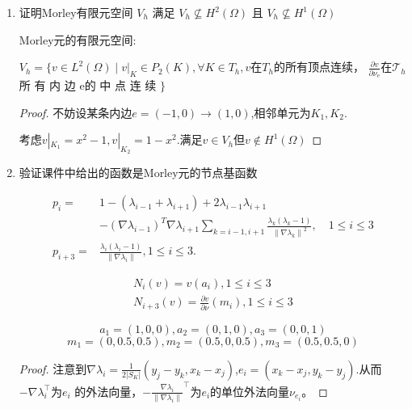 \documentclass[12pt,a4paper]{article}
\begin{document}
\begin{enumerate}
\begin{proof}
			解得
			$$a_1=a_2=a_3=a_4 = 0$$
			
			从而$v \equiv 0$.
		\end{proof}
		\item 证明Morley有限元空间 $V_h$ 满足 $V_h \nsubseteq H^2(\Omega)$ 且 $V_h \nsubseteq H^1(\Omega)$
		
		Morley元的有限元空间:
		
		$V_h=\{v\in L^2(\Omega)\mid v|_K\in P_2(K),\forall K\in T_h,v$在$T_h$的所有顶点连续，
		$\frac{\partial v}{\partial\nu_\mathrm{e}}$在$\mathcal{T} _h$所 有 内 边 e的 中 点 连 续 $\}$
		
		\begin{proof}
			不妨设某条内边$e = (-1,0)\rightarrow(1,0)$,相邻单元为$K_1,K_2$.
			
			考虑$v |_ {K_1} = x^2-1,v |_ {K_2} = 1-x^2$.满足$v \in V_h$但$v \notin H^1(\Omega)$
		\end{proof}
		\item 验证课件中给出的函数是Morley元的节点基函数
		
		\begin{equation*}
			\begin{aligned}
				p_{i}=& 1-(\lambda_{i-1}+\lambda_{i+1})+2\lambda_{i-1}\lambda_{i+1}  \\
				&-\left(\nabla\lambda_{i-1}\right)^T\nabla\lambda_{i+1}\sum_{k=i-1,i+1}\frac{\lambda_k(\lambda_k-1)}{\left\|\nabla\lambda_k\right\|^2},\quad1\leq i\leq3 \\
				p_{i+3}=& \frac{\lambda_{i}(\lambda_{i}-1)}{\|\nabla\lambda_{i}\|},1\leq i\leq3. 
			\end{aligned}
		\end{equation*}
		
		\begin{equation*}
			\begin{aligned}
				N_i(v)=v(a_i),1\leq i\leq3\\N_{i+3}(v)=\frac{\partial v}{\partial\nu}(m_i),1\leq i\leq3
			\end{aligned}
		\end{equation*}
		
		$$a_1 = (1,0,0),a_2=(0,1,0),a_3=(0,0,1)$$
		$$m_1 = (0,0.5,0.5),m_2=(0.5,0,0.5),m_3=(0.5,0.5,0)$$
		
		\begin{proof}
			
			
			注意到$\nabla \lambda_i = \frac{1}{2|S_K|} (y_j-y_k,x_k-x_j)$,$e_i=(x_k-x_j,y_k-y_j)$.从而$-\nabla \lambda_i ^\top$为$e_i$ 的外法向量，$-\frac{\nabla \lambda_i}{\|\nabla \lambda_i\|}^\top$为$e_i$的单位外法向量$\nu_{e_i}$。
			

\end{proof}
\end{enumerate}
\end{document}

